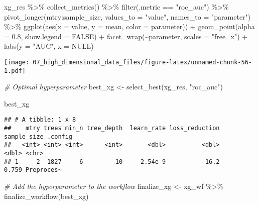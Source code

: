 \documentclass[
]{book}
\newenvironment{Shaded}{\begin{snugshade}}{\end{snugshade}}
\newcommand{\AttributeTok}[1]{\textcolor[rgb]{0.77,0.63,0.00}{#1}}
\newcommand{\CommentTok}[1]{\textcolor[rgb]{0.56,0.35,0.01}{\textit{#1}}}
\newcommand{\ConstantTok}[1]{\textcolor[rgb]{0.00,0.00,0.00}{#1}}
\newcommand{\FloatTok}[1]{\textcolor[rgb]{0.00,0.00,0.81}{#1}}
\newcommand{\FunctionTok}[1]{\textcolor[rgb]{0.00,0.00,0.00}{#1}}
\newcommand{\NormalTok}[1]{#1}
\newcommand{\OtherTok}[1]{\textcolor[rgb]{0.56,0.35,0.01}{#1}}
\newcommand{\SpecialCharTok}[1]{\textcolor[rgb]{0.00,0.00,0.00}{#1}}
\newcommand{\StringTok}[1]{\textcolor[rgb]{0.31,0.60,0.02}{#1}}
\begin{document}
\begin{Shaded}
\begin{Highlighting}[]
\NormalTok{xg\_res }\SpecialCharTok{\%\textgreater{}\%}
  \FunctionTok{collect\_metrics}\NormalTok{() }\SpecialCharTok{\%\textgreater{}\%} 
  \FunctionTok{filter}\NormalTok{(.metric }\SpecialCharTok{==} \StringTok{"roc\_auc"}\NormalTok{) }\SpecialCharTok{\%\textgreater{}\%}
  \FunctionTok{pivot\_longer}\NormalTok{(mtry}\SpecialCharTok{:}\NormalTok{sample\_size,}
               \AttributeTok{values\_to =} \StringTok{"value"}\NormalTok{,}
               \AttributeTok{names\_to =} \StringTok{"parameter"}\NormalTok{) }\SpecialCharTok{\%\textgreater{}\%}
  \FunctionTok{ggplot}\NormalTok{(}\FunctionTok{aes}\NormalTok{(}\AttributeTok{x =}\NormalTok{ value, }\AttributeTok{y =}\NormalTok{ mean, }\AttributeTok{color =}\NormalTok{ parameter)) }\SpecialCharTok{+}
    \FunctionTok{geom\_point}\NormalTok{(}\AttributeTok{alpha =} \FloatTok{0.8}\NormalTok{, }\AttributeTok{show.legend =} \ConstantTok{FALSE}\NormalTok{) }\SpecialCharTok{+}
    \FunctionTok{facet\_wrap}\NormalTok{(}\SpecialCharTok{\textasciitilde{}}\NormalTok{parameter, }\AttributeTok{scales =} \StringTok{"free\_x"}\NormalTok{) }\SpecialCharTok{+}
    \FunctionTok{labs}\NormalTok{(}\AttributeTok{y =} \StringTok{"AUC"}\NormalTok{,}
         \AttributeTok{x =} \ConstantTok{NULL}\NormalTok{)}
\end{Highlighting}
\end{Shaded}

\texttt{[image: 07\_high\_dimensional\_data\_files/figure-latex/unnamed-chunk-56-1.pdf]}

\begin{Shaded}
\begin{Highlighting}[]
\CommentTok{\# Optimal hyperparameter}
\NormalTok{best\_xg }\OtherTok{\textless{}{-}} \FunctionTok{select\_best}\NormalTok{(xg\_res, }\StringTok{"roc\_auc"}\NormalTok{)}

\NormalTok{best\_xg }
\end{Highlighting}
\end{Shaded}

\begin{verbatim}
## # A tibble: 1 x 8
##    mtry trees min_n tree_depth  learn_rate loss_reduction sample_size .config   
##   <int> <int> <int>      <int>       <dbl>          <dbl>       <dbl> <chr>     
## 1     2  1827     6         10     2.54e-9           16.2       0.759 Preproces~
\end{verbatim}

\begin{Shaded}
\begin{Highlighting}[]
\CommentTok{\# Add the hyperparameter to the workflow }
\NormalTok{finalize\_xg }\OtherTok{\textless{}{-}}\NormalTok{ xg\_wf }\SpecialCharTok{\%\textgreater{}\%}
  \FunctionTok{finalize\_workflow}\NormalTok{(best\_xg)}
\end{Highlighting}
\end{Shaded}
\end{document}
